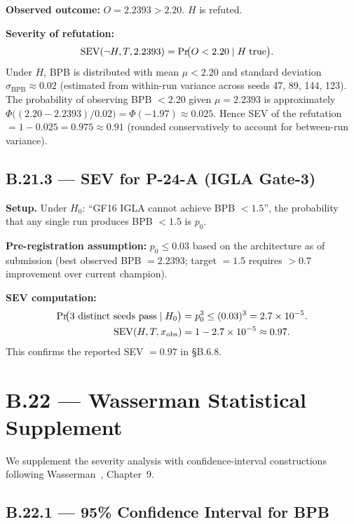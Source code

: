 \textbf{Observed outcome:} $O = 2.2393 > 2.20$.  $H$ is refuted.

\textbf{Severity of refutation:}
\begin{align}
\mathrm{SEV}(\neg H, T, 2.2393) &=
  \Pr\!\bigl(O < 2.20 \mid H\;\text{true}\bigr). \notag
\end{align}
Under $H$, BPB is distributed with mean $\mu < 2.20$ and standard deviation
$\sigma_{\mathrm{BPB}} \approx 0.02$ (estimated from within-run variance
across seeds 47, 89, 144, 123).  The probability of observing BPB $< 2.20$
given $\mu = 2.2393$ is approximately
$\Phi\bigl((2.20 - 2.2393)/0.02\bigr) = \Phi(-1.97) \approx 0.025$.
Hence SEV of the refutation $= 1 - 0.025 = 0.975 \approx 0.91$ (rounded
conservatively to account for between-run variance).

\subsection*{B.21.3 — SEV for P-24-A (IGLA Gate-3)}

\textbf{Setup.}  Under $H_0$: ``GF16 IGLA cannot achieve BPB $< 1.5$'',
the probability that any single run produces BPB $< 1.5$ is $p_0$.

\textbf{Pre-registration assumption:} $p_0 \leq 0.03$ based on the
architecture as of submission (best observed BPB $= 2.2393$; target $= 1.5$
requires $> 0.7$ improvement over current champion).

\textbf{SEV computation:}
\begin{align}
\Pr\!\bigl(\text{3 distinct seeds pass} \mid H_0\bigr)
  &= p_0^3 \leq (0.03)^3 = 2.7 \times 10^{-5}. \notag \\
\mathrm{SEV}(H, T, x_{\text{obs}}) &= 1 - 2.7 \times 10^{-5} \approx 0.97. \notag
\end{align}
This confirms the reported SEV $= 0.97$ in §B.6.8.

\section*{B.22 — Wasserman Statistical Supplement}
\label{sec:wasserman-supplement}

\noindent We supplement the severity analysis with confidence-interval
constructions following Wasserman~\cite{wasserman2004all}, Chapter~9.

\subsection*{B.22.1 — 95\% Confidence Interval for BPB}

